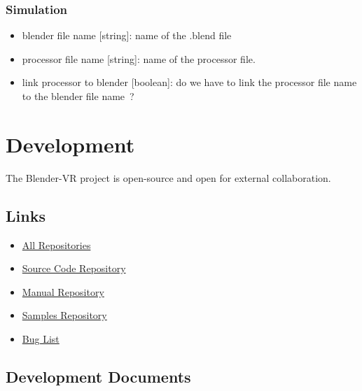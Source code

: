 \documentclass[a4,10pt,openany,oneside]{sphinxmanual}
\begin{document}
\subsection{Simulation}
\label{architecture/protocols:simulation}\begin{itemize}
\item {} 
blender file name {[}string{]}: name of the .blend file

\item {} 
processor file name {[}string{]}: name of the processor file.

\item {} 
link processor to blender {[}boolean{]}: do we have to link the processor file name to the blender file name ?

\end{itemize}


\chapter{Development}
\label{development/index:development}\label{development/index::doc}
The Blender-VR project is open-source and open for external collaboration.


\section{Links}
\label{development/index:links}\begin{itemize}
\item {} 
\href{https://github.com/BlenderVR}{All Repositories}

\item {} 
\href{https://github.com/BlenderVR/blender-vr}{Source Code Repository}

\item {} 
\href{https://github.com/BlenderVR/manual}{Manual Repository}

\item {} 
\href{https://github.com/BlenderVR/samples}{Samples Repository}

\item {} 
\href{https://github.com/BlenderVR/blender-vr/issues}{Bug List}

\end{itemize}


\section{Development Documents}
\label{development/index:development-documents}
\end{document}
